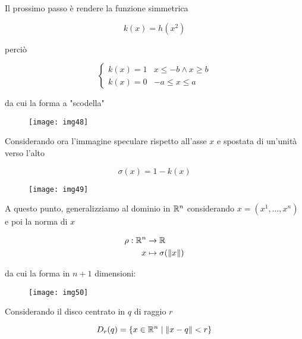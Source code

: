 Il prossimo passo è rendere la funzione simmetrica

\begin{equation}
	k(x) = h(x^{2})
\end{equation}

perciò

\begin{equation}
	\begin{cases}
		k(x) = 1 & x \leqslant -b \wedge x \geqslant b\\
		k(x) = 0 & -a \leqslant x \leqslant a
	\end{cases}
\end{equation}

da cui la forma a "scodella"

\begin{figure}[H]
	\centering
	\texttt{[image: img48]}
\end{figure}

Considerando ora l'immagine speculare rispetto all'asse $ x $ e spostata di un'unità verso l'alto

\begin{equation}
	\sigma(x) = 1 - k(x)
\end{equation}

\begin{figure}[H]
	\centering
	\texttt{[image: img49]}
\end{figure}

A questo punto, generalizziamo al dominio in $ \mathbb{R}^{n} $ considerando $ x = (x^{1},\dots,x^{n}) $ e poi la norma di $ x $

\begin{align}
	\begin{split}
		\rho : \mathbb{R}^{n} &\to \mathbb{R}\\
		x &\mapsto \sigma(\norm{x})
	\end{split}
\end{align}

da cui la forma in $ n+1 $ dimensioni:

\begin{figure}[H]
	\centering
	\texttt{[image: img50]}
\end{figure}

Considerando il disco centrato in $ q $ di raggio $ r $

\begin{equation}
	D_{r}(q) = \{ x \in \mathbb{R}^{n} \mid \norm{x - q} < r \}
\end{equation}

